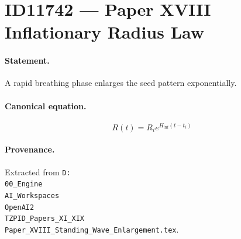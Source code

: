 \section*{ID11742 --- Paper XVIII Inflationary Radius Law}

\paragraph{Statement.}
A rapid breathing phase enlarges the seed pattern exponentially.

\paragraph{Canonical equation.}
\[
R(t)=R_i e^{H_{\mathrm{inf}}(t-t_i)}
\]

\paragraph{Provenance.}
Extracted from \texttt{D:\\00\_Engine\\AI\_Workspaces\\OpenAI2\\TZPID\_Papers\_XI\_XIX\\Paper\_XVIII\_Standing\_Wave\_Enlargement.tex}.
